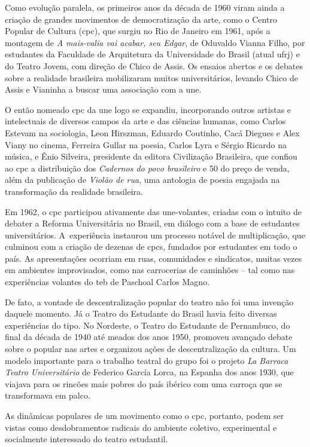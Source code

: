 Como evolução paralela, os primeiros anos da década de 1960 viram ainda
a criação de grandes movimentos de democratização da arte, como o Centro
Popular de Cultura ({\sc cpc}), que surgiu no Rio de Janeiro em 1961, após a
montagem de {\it A mais-valia vai acabar, seu Edgar}, de Oduvaldo Vianna
Filho, por estudantes da Faculdade de Arquitetura da Universidade do
Brasil (atual {\sc ufrj}) e do Teatro Jovem, com direção de Chico de Assis. Os
ensaios abertos e os debates sobre a realidade brasileira mobilizaram
muitos universitários, levando Chico de Assis e Vianinha a buscar uma
associação com a {\sc une}.

O então nomeado {\sc cpc} da {\sc une} logo se expandiu, incorporando outros
artistas e intelectuais de diversos campos da arte e das ciências
humanas, como Carlos Estevam na sociologia, Leon Hirszman, Eduardo
Coutinho, Cacá Diegues e Alex Viany no cinema, Ferreira Gullar na
poesia, Carlos Lyra e Sérgio Ricardo na música, e Ênio Silveira,
presidente da editora Civilização Brasileira, que confiou ao {\sc cpc} a
distribuição dos {\it Cadernos do povo brasileiro} e 50
do preço de venda, além da publicação de {\it Violão de rua}, uma
antologia de poesia engajada na transformação da realidade brasileira.

Em 1962, o {\sc cpc} participou ativamente das {\sc une-v}olantes, criadas com o
intuito de debater a Reforma Universitária no Brasil, em diálogo com a
base de estudantes universitários. A~experiência instaurou um processo
notável de multiplicação, que culminou com a criação de dezenas de {\sc cpc}s,
fundados por estudantes em todo o país. As apresentações ocorriam em
ruas, comunidades e sindicatos, muitas vezes em ambientes improvisados,
como nas carrocerias de caminhões -- tal como nas experiências volantes
do {\sc teb} de Paschoal Carlos Magno.

De fato, a vontade de descentralização popular do teatro não foi uma
invenção daquele momento. Já o Teatro do Estudante do Brasil havia feito
diversas experiências do tipo. No Nordeste, o Teatro do Estudante de
Pernambuco, do final da década de 1940 até meados dos anos 1950,
promoveu avançado debate sobre o popular nas artes e organizou ações de
descentralização da cultura. Um modelo importante para o trabalho
teatral do grupo foi o projeto {\it La Barraca Teatro Universitário} de
Federico García Lorca, na Espanha dos anos 1930, que viajava para os
rincões mais pobres do país ibérico com uma carroça que se transformava
em palco.

As dinâmicas populares de um movimento como o {\sc cpc}, portanto, podem ser
vistas como desdobramentos radicais do ambiente coletivo, experimental e
socialmente interessado do teatro estudantil.

